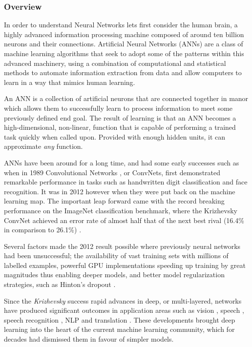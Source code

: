 \documentclass[a4paper,11pt,titlepage]{article}
\begin{document}
	\subsubsection{Overview}
			In order to understand Neural Networks lets first consider the human brain, a highly advanced information processing machine composed of around ten billion neurons and their connections. Artificial Neural Networks (ANNs) are a class of machine learning algorithms that seek to adopt some of the patterns within this advanced machinery, using a combination of computational and statistical methods to automate information extraction from data and allow computers to learn in a way that mimics human learning.
			\par 
			An ANN is a collection of artificial neurons that are connected together in manor which allows them to successfully learn to process information to meet some previously defined end goal. The result of learning is that an ANN becomes a high-dimensional, non-linear, function that is capable of performing a trained task quickly when called upon. Provided with enough hidden units, it can approximate \textit{any} function. 
			\par
			ANNs have been around for a long time, and had some early successes such as when in 1989 Convolutional Networks \cite{LeCun1989}, or ConvNets, first demonstrated remarkable performance in tasks such as handwritten digit classification and face recognition. It was in 2012 however when they were put back on the machine learning map. The important leap forward came with the record breaking performance on the ImageNet classification benchmark, where the Krizhevsky ConvNet achieved an error rate of almost half that of the next best rival (16.4\% in comparison to 26.1\%) \cite{Krizhevsky2012}.
			\par
			Several factors made the 2012 result possible where previously neural networks had been unsuccessful; the availability of vast training sets with millions of labelled examples, powerful GPU implementations speeding up training by great magnitudes thus enabling deeper models, and better model regularization strategies, such as Hinton's dropout \cite{Hinton2012}.
			\par 
			Since the \textit{Krizhevsky} success rapid advances in deep, or multi-layered, networks have produced significant outcomes in application areas such as vision \cite{Russakovsky2015}, speech \cite{Sutskever2014}, speech recognition \cite{Sainath2015}, NLP \cite{Norouzi2014} and  translation \cite{Graves2014}. These developments brought deep learning into the heart of the current machine learning community, which for decades had dismissed them in favour of simpler models.
\\\
\\\	
\end{document}
